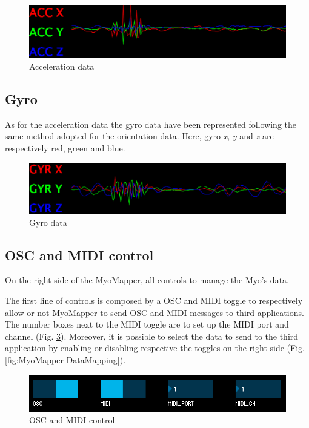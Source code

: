\documentclass[12pt,a4paper]{article}
\begin{document}
		\begin{figure}[h]
			\centering
			\includegraphics[width=0.6\linewidth]{../MyoMapper-Acc}
			\caption{Acceleration data}
			\label{fig:MyoMapper-Acc}
		\end{figure}	
		
		\subsection{Gyro}
		As for the acceleration data the gyro data have been represented following the same method adopted for the orientation data. Here, gyro \textit{x}, \textit{y} and \textit{z} are respectively red, green and blue.
		
		\begin{figure}[h]
			\centering
			\includegraphics[width=0.6\linewidth]{../MyoMapper-Gyro}
			\caption{Gyro data}
			\label{fig:MyoMapper-Gyro}
		\end{figure}	
		
		\subsection{OSC and MIDI control}
		On the right side of the MyoMapper, all controls to manage the Myo's data.
		
		The first line of controls is composed by a OSC and MIDI toggle to respectively allow or not MyoMapper to send OSC and MIDI messages to third applications. The number boxes next to the MIDI toggle are to set up the MIDI port and channel (Fig. \ref{fig:MyoMapper-OSC-MIDI}).
		Moreover, it is possible to select the data to send to the third application by enabling or disabling respective the toggles on the right side (Fig. \ref{fig:MyoMapper-DataMapping}).
		
		\begin{figure}[h]
			\centering
			\includegraphics[width=0.6\linewidth]{../MyoMapper-OSC-MIDI}
			\caption{OSC and MIDI control}
			\label{fig:MyoMapper-OSC-MIDI}
		\end{figure}
		
\end{document}
